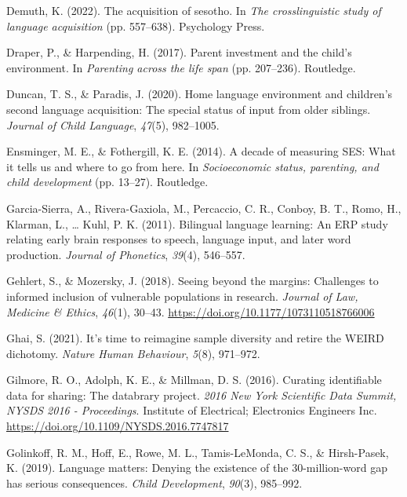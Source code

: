 \documentclass[
  man,floatsintext]{apa6}
\newlength{\cslhangindent}
\newenvironment{CSLReferences}[2] %
 {\begin{list}{}{%
  \setlength{\itemindent}{0pt}
  \setlength{\leftmargin}{0pt}
  \setlength{\parsep}{0pt}
  \ifodd #1
   \setlength{\leftmargin}{\cslhangindent}
   \setlength{\itemindent}{-1\cslhangindent}
  \fi
  \setlength{\itemsep}{#2\baselineskip}}}
 {\end{list}}
\begin{document}
\begin{CSLReferences}{1}{0}
Demuth, K. (2022). The acquisition of sesotho. In \emph{The crosslinguistic study of language acquisition} (pp. 557--638). Psychology Press.

Draper, P., \& Harpending, H. (2017). Parent investment and the child's environment. In \emph{Parenting across the life span} (pp. 207--236). Routledge.

Duncan, T. S., \& Paradis, J. (2020). Home language environment and children's second language acquisition: The special status of input from older siblings. \emph{Journal of Child Language}, \emph{47}(5), 982--1005.

Ensminger, M. E., \& Fothergill, K. E. (2014). A decade of measuring SES: What it tells us and where to go from here. In \emph{Socioeconomic status, parenting, and child development} (pp. 13--27). Routledge.

Garcia-Sierra, A., Rivera-Gaxiola, M., Percaccio, C. R., Conboy, B. T., Romo, H., Klarman, L., \ldots{} Kuhl, P. K. (2011). Bilingual language learning: An ERP study relating early brain responses to speech, language input, and later word production. \emph{Journal of Phonetics}, \emph{39}(4), 546--557.

Gehlert, S., \& Mozersky, J. (2018). Seeing beyond the margins: Challenges to informed inclusion of vulnerable populations in research. \emph{Journal of Law, Medicine \& Ethics}, \emph{46}(1), 30--43. \url{https://doi.org/10.1177/1073110518766006}

Ghai, S. (2021). It's time to reimagine sample diversity and retire the WEIRD dichotomy. \emph{Nature Human Behaviour}, \emph{5}(8), 971--972.

Gilmore, R. O., Adolph, K. E., \& Millman, D. S. (2016). Curating identifiable data for sharing: The databrary project. \emph{2016 New York Scientific Data Summit, NYSDS 2016 - Proceedings}. Institute of Electrical; Electronics Engineers Inc. \url{https://doi.org/10.1109/NYSDS.2016.7747817}

Golinkoff, R. M., Hoff, E., Rowe, M. L., Tamis-LeMonda, C. S., \& Hirsh-Pasek, K. (2019). Language matters: Denying the existence of the 30-million-word gap has serious consequences. \emph{Child Development}, \emph{90}(3), 985--992.


\end{CSLReferences}
\end{document}
